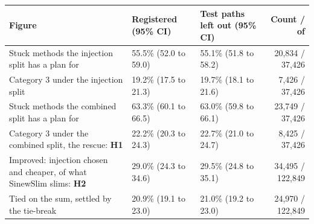 \begin{tabular}{>{\raggedright\arraybackslash}p{6.2cm}llr}
\toprule
Figure & Registered (95\% CI) & Test paths left out (95\% CI) & Count / of \\
\midrule
Stuck methods the injection split has a plan for & 55.5\% (52.0 to 59.0) & 55.1\% (51.8 to 58.2) & 20{,}834 / 37{,}426 \\
Category 3 under the injection split & 19.2\% (17.5 to 21.3) & 19.7\% (18.1 to 21.6) & 7{,}426 / 37{,}426 \\
Stuck methods the combined split has a plan for & 63.3\% (60.1 to 66.5) & 63.0\% (59.8 to 66.1) & 23{,}749 / 37{,}426 \\
Category 3 under the combined split, the rescue: \textbf{H1} & 22.2\% (20.3 to 24.3) & 22.7\% (21.0 to 24.7) & 8{,}425 / 37{,}426 \\
Improved: injection chosen and cheaper, of what SinewSlim slims: \textbf{H2} & 29.0\% (24.3 to 34.6) & 29.5\% (24.8 to 35.1) & 34{,}495 / 122{,}849 \\
Tied on the sum, settled by the tie-break & 20.9\% (19.1 to 23.0) & 21.0\% (19.2 to 23.0) & 24{,}970 / 122{,}849 \\
\bottomrule
\end{tabular}
